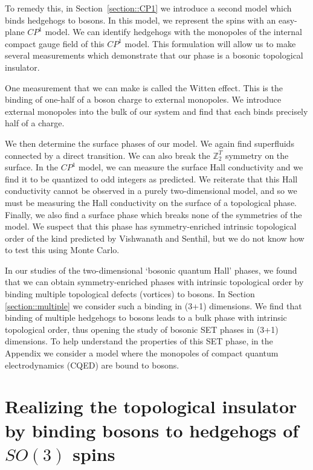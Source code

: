 \documentclass[prb,twocolumn]{revtex4-1}
\def\ztwot{\mathbb{Z}_2^T}
\newcommand{\cp}{$CP^1$ }
\begin{document}
To remedy this, in Section~\ref{section::CP1} we introduce a second model which binds hedgehogs to bosons. In this model, we represent the spins with an easy-plane \cp model. We can identify hedgehogs with the monopoles of the internal compact gauge field of this \cp model. This formulation will allow us to make several measurements which demonstrate that our phase is a bosonic topological insulator.

One measurement that we can make is called the Witten effect.\cite{MaxWitten,Max} This is the binding of one-half of a boson charge to external monopoles. We introduce external monopoles into the bulk of our system and find that each binds precisely half of a charge.

We then determine the surface phases of our model. We again find superfluids connected by a direct transition.  We can also break the $\ztwot$ symmetry on the surface. In the \cp model, we can measure the surface Hall conductivity and we find it to be quantized to odd integers as predicted. We reiterate that this Hall conductivity cannot be observed in a purely two-dimensional model, and so we must be measuring the Hall conductivity on the surface of a topological phase. Finally, we also find a surface phase which breaks none of the symmetries of the model. We suspect that this phase has symmetry-enriched intrinsic topological order of the kind predicted by Vishwanath and Senthil,\cite{SenthilVishwanath} but we do not know how to test this using Monte Carlo.

In our studies of the two-dimensional `bosonic quantum Hall' phases,\cite{FQHE} we found that we can obtain symmetry-enriched phases with intrinsic topological order by binding multiple topological defects (vortices) to bosons. In Section \ref{section::multiple} we consider such a binding in (3+1) dimensions. We find that binding of multiple hedgehogs to bosons leads to a bulk phase with intrinsic topological order, thus opening the study of bosonic SET phases in (3+1) dimensions. To help understand the properties of this SET phase, in the Appendix we consider a model where the monopoles of compact quantum electrodynamics (CQED) are bound to bosons. 

\section{Realizing the topological insulator by binding bosons to hedgehogs of $SO(3)$ spins}
\label{section::Heisenberg}
\end{document}
